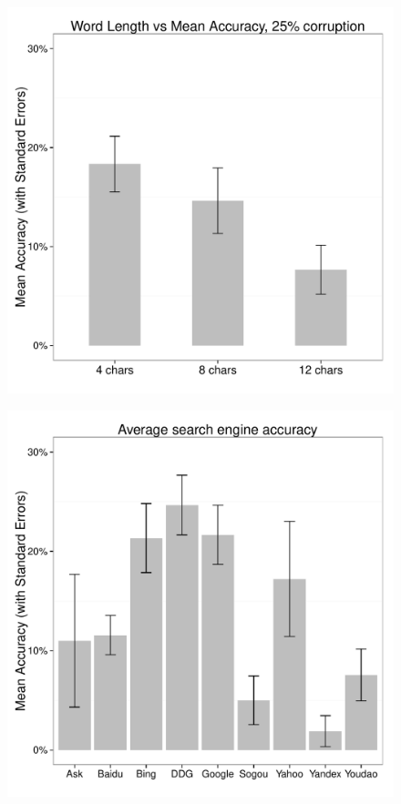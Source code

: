 \documentclass{csfourzero}
\begin{document}
\begin{figure}
  \centering
  \begin{minipage}{.5\textwidth}
    \centering
    \includegraphics[width=\textwidth]{len_vs_acc}
    \label{fig:lengths}
  \end{minipage}%
  \begin{minipage}{.5\textwidth}
    \centering
    \includegraphics[width=\textwidth]{eng_vs_acc}
    \label{fig:searchengines}
  \end{minipage}
\end{figure}
\end{document}
